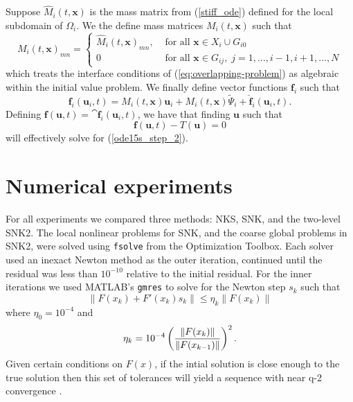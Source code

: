 Suppose $\hat{M}_i(t,\bm{x})$ is the mass matrix from (\ref{stiff_ode}) defined for the local subdomain of $\Omega_i$. We the define mass matrices $M_i(t,\bm{x})$ such that
\begin{equation}
	M_i(t,\bm{x})_{mn} = 
  \begin{cases}
    \hat{M}_i(t,\bm{x})_{mn}, & \text{ for all } \bm{x} \in X_i \cup G_{i0} \\
    0 & \text{ for all } \bm{x} \in G_{ij}, \; j=1,\ldots,i-1,i+1,\ldots,N
  \end{cases}
\end{equation}
which treats the interface conditions of (\ref{eq:overlapping-problem}) as algebraic within the initial value problem. We finally define vector functions $\bm{f}_i$ such that
\begin{equation}
	\bm{f}_i(\bm{u}_i,t) = M_i(t,\bm{x})\bm{u}_i+M_i(t,\bm{x}) \tilde{\Psi}_i+\bm{\hat{f}}_i(\bm{u}_i,t).
\end{equation}
Defining $\bm{f}(\bm{u},t)=\cat{\bm{f}_i(\bm{u}_i,t)}$, we have that finding $\bm{u}$ such that
\begin{equation}
\bm{f}(\bm{u},t) - T(\bm{u})	 = 0
\end{equation}
will effectively solve for (\ref{ode15s_step_2}).
\section{Numerical experiments}
\label{sec:experiments}

For all experiments we compared three methods: NKS, SNK, and the two-level SNK2. The local nonlinear problems for SNK, and the coarse global problems in SNK2, were solved using \texttt{fsolve} from the Optimization Toolbox. Each solver used an inexact Newton method as the outer iteration, continued until the residual was less than $10^{-10}$ relative to the initial residual. For the inner iterations we used MATLAB's \texttt{gmres} to solve for the Newton step $s_k$ such that
\begin{equation}
  \| F(x_k) + F'(x_k)s_k \| \leq \eta_k \| F(x_k) \|	
\end{equation}
where $\eta_0 = 10^{-4}$ and
\begin{equation}
  \label{eq:forcing}
  \eta_k = 10^{-4} \left( \frac{\| F(x_k) \|}{\| F(x_{k-1})\|} \right)^2.	
\end{equation}
Given certain conditions on $F(x)$, if the intial solution is close enough to the true solution then this set of tolerances will yield a sequence with near q-2 convergence \cite{Eisenstat1996}. 


